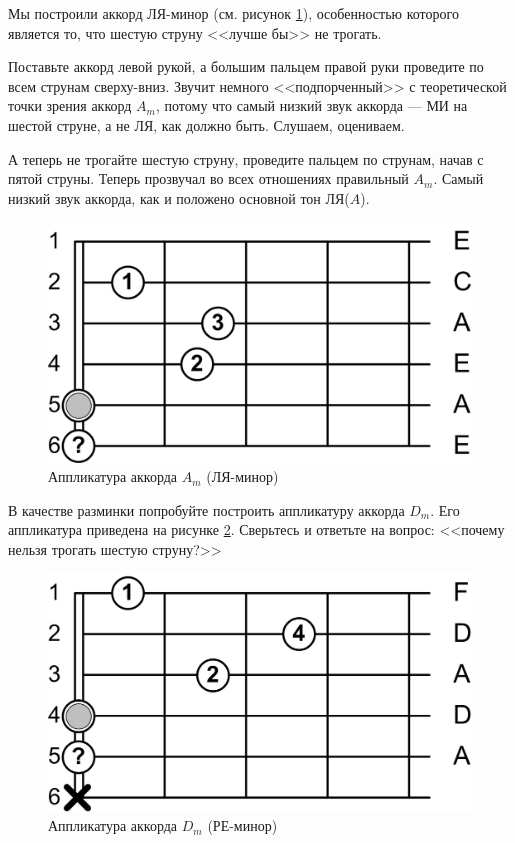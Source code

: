 \begin{Example}
    Мы построили аккорд ЛЯ-минор (см. рисунок \ref{fig:harmony:chords:Am}), особенностью которого является то, что шестую струну <<лучше бы>> не трогать.
    
    Поставьте аккорд левой рукой, а большим пальцем правой руки проведите по всем струнам сверху-вниз. Звучит немного <<подпорченный>> с теоретической точки зрения аккорд $A_m$, потому что самый низкий звук аккорда --- МИ на шестой струне, а не ЛЯ, как должно быть. Слушаем, оцениваем.
    
    А теперь не трогайте шестую струну, проведите пальцем по струнам, начав с пятой струны. Теперь прозвучал во всех отношениях правильный $A_m$. Самый низкий звук аккорда, как и положено основной тон ЛЯ($A$).
\end{Example}

\begin{figure}[!ht]
    \centering
    \includegraphics{fig/chords/Am} 
    \caption{Аппликатура аккорда $A_m$ (ЛЯ-минор)}\label{fig:harmony:chords:Am}
\end{figure} 

В качестве разминки попробуйте построить аппликатуру аккорда $D_m$. Его аппликатура приведена на рисунке \ref{fig:harmony:chords:Dm}. Сверьтесь и ответьте на вопрос: <<почему нельзя трогать шестую струну?>>

\begin{figure}[!ht]
    \centering
    \includegraphics{fig/chords/Dm} 
    \caption{Аппликатура аккорда $D_m$ (РЕ-минор)}\label{fig:harmony:chords:Dm}
\end{figure} 

